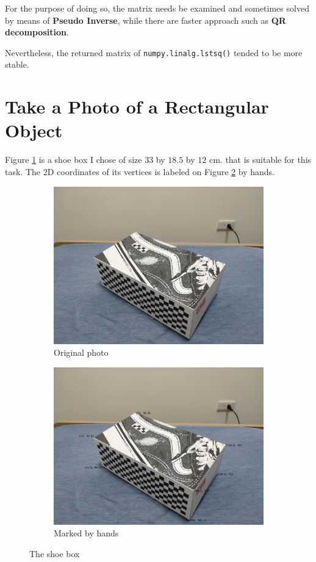 \documentclass[12pt, a4paper]{article}
\begin{document}
For the purpose of doing so, the matrix needs be examined and sometimes solved by means of \textbf{Pseudo Inverse}, while there are faster approach such as \textbf{QR decomposition}.

Nevertheless, the returned matrix of \texttt{numpy.linalg.lstsq()} tended to be more stable.

\section{Take a Photo of a Rectangular Object}

Figure \ref{fig:box_org} is a shoe box I chose of size \(33\) by \(18.5\) by \(12\) cm. that is suitable for this task. The 2D coordinates of its vertices is labeled on Figure \ref{fig:box_marked} by hands.

\begin{figure}[htbp]
\centering
\begin{subfigure}{.45\linewidth}
\includegraphics[width=\linewidth]{A2_110062219.JPG}
\caption{Original photo}
\label{fig:box_org}
\end{subfigure}
\begin{subfigure}{.45\linewidth}
\includegraphics[width=\linewidth]{A2_110062219_marked.JPG}
\caption{Marked by hands}
\label{fig:box_marked}
\end{subfigure}
\caption{The shoe box}
\label{fig:box}
\end{figure}
\end{document}
